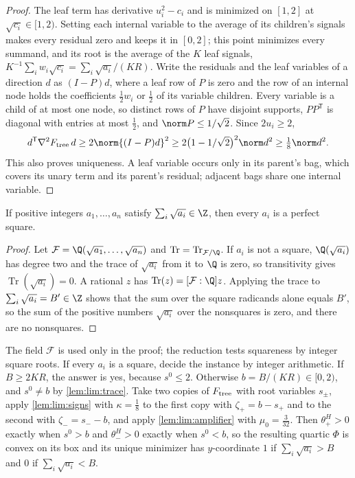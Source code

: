\begin{proof}
The leaf term has derivative $u_i^2-c_i$ and is minimized on $[1,2]$ at
$\sqrt{c_i}\in[1,2)$. Setting each internal variable to the average of its
children's signals makes every residual zero and keeps it in $[0,2]$; this
point minimizes every summand, and its root is the average of the $K$ leaf
signals, $K^{-1}\sum_iw_i\sqrt{c_i}=\sum_i\sqrt{a_i}/(KR)$. Write the
residuals and the leaf variables of a direction $d$ as $(I-P)d$, where a
leaf row of $P$ is zero and the row of an internal node holds the
coefficients $\frac12w_i$ or $\frac12$ of its variable children. Every
variable is a child of at most one node, so distinct rows of $P$ have
disjoint supports, $PP^{\mathsf T}$ is diagonal with entries at most
$\frac12$, and $\norm P\le1/\sqrt2$. Since $2u_i\ge2$,
\[
 d^{\mathsf T}\nabla^2F_{\rm tree}\,d\ge2\norm{(I-P)d}^2
 \ge2\bigl(1-1/\sqrt2\bigr)^2\norm d^2\ge\tfrac18\norm d^2 .
\]
This also proves uniqueness. A leaf variable occurs only in its parent's
bag, which covers its unary term and its parent's residual; adjacent bags
share one internal variable.
\end{proof}

\begin{lemma}\label{lem:lim:trace}
If positive integers $a_1,\ldots,a_n$ satisfy $\sum_i\sqrt{a_i}\in\Z$, then
every $a_i$ is a perfect square.
\end{lemma}

\begin{proof}
Let $\mathcal F=\Q(\sqrt{a_1},\ldots,\sqrt{a_n})$ and
$\operatorname{Tr}=\operatorname{Tr}_{\mathcal F/\Q}$. If $a_i$ is not a
square, $\Q(\sqrt{a_i})$ has degree two and the trace of $\sqrt{a_i}$ from it
to $\Q$ is zero, so transitivity gives $\operatorname{Tr}(\sqrt{a_i})=0$. A
rational $z$ has $\operatorname{Tr}(z)=[\mathcal F:\Q]z$. Applying the trace
to $\sum_i\sqrt{a_i}=B'\in\Z$ shows that the sum over the square radicands
alone equals $B'$, so the sum of the positive numbers $\sqrt{a_i}$ over the
nonsquares is zero, and there are no nonsquares.
\end{proof}

The field $\mathcal F$ is used only in the proof; the reduction tests
squareness by integer square roots. If every $a_i$ is a square, decide the
instance by integer arithmetic. If $B\ge2KR$, the answer is yes, because
$s^0\le2$. Otherwise $b=B/(KR)\in[0,2)$, and $s^0\ne b$ by
\cref{lem:lim:trace}. Take two copies of $F_{\rm tree}$ with root variables
$s_\pm$, apply \cref{lem:lim:signs} with $\kappa=\frac18$ to the first copy
with $\zeta_+=b-s_+$ and to the second with $\zeta_-=s_--b$, and apply
\cref{lem:lim:amplifier} with $\mu_0=\frac3{32}$. Then $\theta_+^H>0$ exactly
when $s^0>b$ and $\theta_-^H>0$ exactly when $s^0<b$, so the resulting
quartic $\Phi$ is convex on its box and its unique minimizer has
$y$-coordinate $1$ if $\sum_i\sqrt{a_i}>B$ and $0$ if $\sum_i\sqrt{a_i}<B$.

